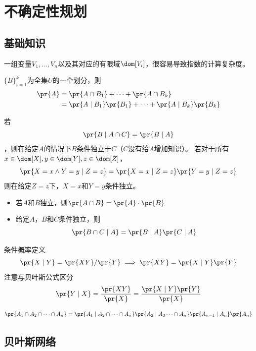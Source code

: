
\section{不确定性规划}
\subsection{基础知识}
一组变量$V_1,\ldots,V_n$以及其对应的有限域$\dom[V_i]$，很容易导致指数的计算复杂度。
\begin{theorem}[全概率公式]
$\{B\}_{i=1}^k$为全集$U$的一个划分，则
\[\begin{aligned}
\pr{A}&=\pr{A\cap B_1}+\cdots+\pr{A\cap B_k}\\
&=\pr{A\mid B_1}\pr{B_1}+\cdots+\pr{A\mid B_k}\pr{B_k}
\end{aligned}\]
\end{theorem}
\begin{theorem}[条件独立]
若
\[\pr{B\mid A\cap C}=\pr{B\mid A}\]
，则在给定$A$的情况下$B$条件独立于$C$（$C$没有给$A$增加知识）。
若对于所有$x\in\dom[X],y\in\dom[Y],z\in\dom[Z]$，
\[\pr{X=x\land Y=y\mid Z=z}=\pr{X=x\mid Z=z}\pr{Y=y\mid Z=z}\]
则在给定$Z=z$下，$X=x$和$Y=y$条件独立。
\end{theorem}
\begin{proposition}[独立性性质]
\begin{itemize}
	\item 若$A$和$B$独立，则$\pr{A\cap B}=\pr{A}\cdot\pr{B}$
	\item 给定$A$，$B$和$C$条件独立，则
	\[\pr{B\cap C\mid A}=\pr{B\mid A}\pr{C\mid A}\]
\end{itemize}
\end{proposition}
\begin{theorem}[贝叶斯公式]
条件概率定义
\[\pr{X\mid Y}=\pr{XY}/\pr{Y}\implies \pr{XY}=\pr{X\mid Y}\pr{Y}\]
注意与贝叶斯公式区分
\[\pr{Y\mid X}=\frac{\pr{XY}}{\pr{X}}=\frac{\pr{X\mid Y}\pr{Y}}{\pr{X}}\]
\end{theorem}
\begin{theorem}[链式法则]
\[\pr{A_1\cap A_2\cap\cdots\cap A_n}=\pr{A_1\mid A_2\cap\cdots\cap A_n}\pr{A_2\mid A_3\cdots\cap A_n}\pr{A_{n-1}\mid A_n}\pr{A_n}\]
\end{theorem}

\subsection{贝叶斯网络}
